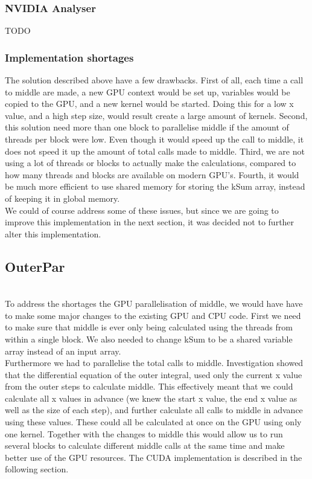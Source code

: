 \subsubsection{NVIDIA Analyser} \hfill
TODO

\subsubsection{Implementation shortages} \hfill
The solution described above have a few drawbacks. First of all, each time a call to middle are made, a new GPU context would be set up, variables would be copied to the GPU, and a new kernel would be started. Doing this for a low x value, and a high step size, would result create a large amount of kernels. Second, this solution need more than one block to parallelise middle if the amount of threads per block were low. Even though it would speed up the call to middle, it does not speed it up the amount of total calls made to middle. Third, we are not using a lot of threads or blocks to actually make the calculations, compared to how many threads and blocks are available on modern GPU’s. Fourth, it would be much more efficient to use shared memory for storing the kSum array, instead of keeping it in global memory.\\

We could of course address some of these issues, but since we are going to improve this implementation in the next section, it was decided not to further alter this implementation. \\
\subsection{OuterPar} \hfill \\
To address the shortages the GPU parallelisation of middle, we would have have to make some major changes to the existing GPU and CPU code. First we need to make sure that middle is ever only being calculated using the threads from within a single block. We also needed to change kSum to be a shared variable array instead of an input array. \\

Furthermore we had to parallelise the total calls to middle. Investigation showed that the differential equation of the outer integral, used only the current x value from the outer steps to calculate middle. This effectively meant that we could calculate all x values in advance (we knew the start x value, the end x value as well as the size of each step), and further calculate all calls to middle in advance using these values. These could all be calculated at once on the GPU using only one kernel. Together with the changes to middle this would allow us to run several blocks to calculate different middle calls at the same time and make better use of the GPU resources. The CUDA implementation is described in the following section.

